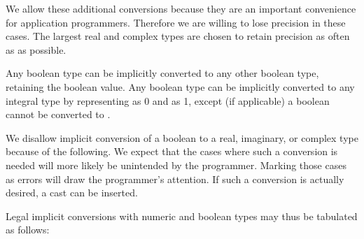 \begin{rationale}
We allow these additional conversions because they are an important
convenience for application programmers. Therefore we are willing to
lose precision in these cases. The largest real and complex types
are chosen to retain precision as often as as possible.
\end{rationale}

Any boolean type can be implicitly converted to any other boolean type,
retaining the boolean value.
Any boolean type can be implicitly converted to any integral type
by representing  as 0 and  as 1,
except (if applicable)
a boolean cannot be converted to .

\begin{rationale}
We disallow implicit conversion of a boolean to
a real, imaginary, or complex type because of the following.
We expect that the cases where such a conversion is needed
will more likely be unintended by the programmer.
Marking those cases as errors will draw the programmer's attention.
If such a conversion is actually desired, a cast 
can be inserted.
\end{rationale}

Legal implicit conversions with numeric and boolean types
may thus be tabulated as follows:

